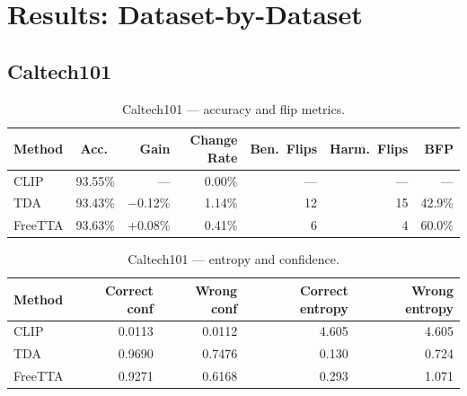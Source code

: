 \documentclass[12pt,a4paper]{article}
\newcommand{\1}{\mathbf{1}}
\begin{document}
\section{Results: Dataset-by-Dataset}

\subsection{Caltech101}

\begin{table}[H]
\centering
\caption{Caltech101 --- accuracy and flip metrics.}
\label{tab:caltech_flip}
\begin{tabular}{@{}lrrrrrr@{}}
\toprule
Method & Acc.\ & Gain & Change Rate & Ben.\ Flips & Harm.\ Flips & BFP \\
\midrule
CLIP    & 93.55\% & ---    & 0.00\% & --- & --- & --- \\
TDA     & 93.43\% & $-$0.12\% & 1.14\% & 12  & 15  & 42.9\% \\
FreeTTA & 93.63\% & +0.08\% & 0.41\% & 6   & 4   & 60.0\% \\
\bottomrule
\end{tabular}
\end{table}

\begin{table}[H]
\centering
\caption{Caltech101 --- entropy and confidence.}
\label{tab:caltech_entropy}
\begin{tabular}{@{}lrrrr@{}}
\toprule
Method & Correct conf & Wrong conf & Correct entropy & Wrong entropy \\
\midrule
CLIP    & 0.0113 & 0.0112 & 4.605 & 4.605 \\
TDA     & 0.9690 & 0.7476 & 0.130 & 0.724 \\
FreeTTA & 0.9271 & 0.6168 & 0.293 & 1.071 \\
\bottomrule
\end{tabular}
\end{table}
\end{document}
